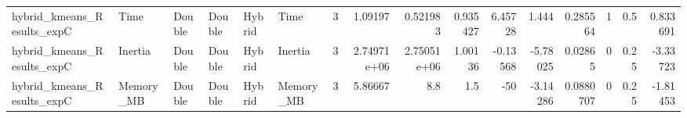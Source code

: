 \begin{tabular}{llllllrrrrrrrrrr}
hybrid_kmeans_Results_expC & Time & Double & Double & Hybrid & Time & 3 & 1.09197 & 0.521983 & 0.935427 & 6.45728 & 1.444 & 0.285564 & 1 & 0.5 & 0.833691 \\
hybrid_kmeans_Results_expC & Inertia & Double & Double & Hybrid & Inertia & 3 & 2.74971e+06 & 2.75051e+06 & 1.00136 & -0.13568 & -5.78025 & 0.02865 & 0 & 0.25 & -3.33723 \\
hybrid_kmeans_Results_expC & Memory_MB & Double & Double & Hybrid & Memory_MB & 3 & 5.86667 & 8.8 & 1.5 & -50 & -3.14286 & 0.0880707 & 0 & 0.25 & -1.81453 \\
\bottomrule
\end{tabular}
